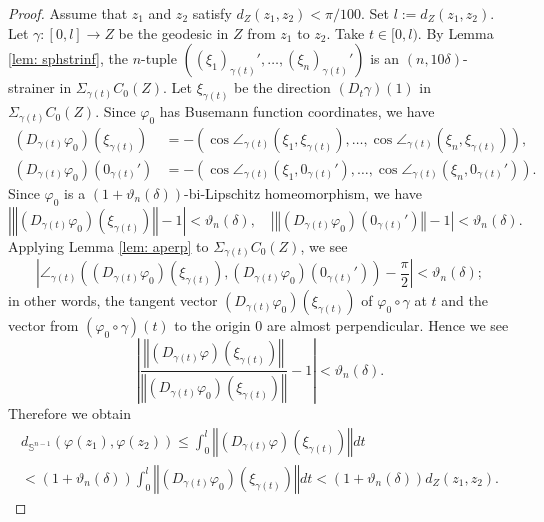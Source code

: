 \documentclass[a4paper,12pt]{amsart}
\newcommand{\Sph}{\operatorname{\mathbb{S}}}
\numberwithin{equation}{section}
\theoremstyle{plain}
\theoremstyle{definition}
\theoremstyle{remark}
\begin{document}
\begin{proof}
Assume that 
$z_1$ and $z_2$ satisfy $d_Z(z_1,z_2) < \pi/100$.
Set $l := d_Z(z_1,z_2)$.
Let $\gamma \colon [0,l] \to Z$ be the geodesic
in $Z$ from $z_1$ to $z_2$.
Take $t \in [0,l)$.
By Lemma \ref{lem: sphstrinf},
the $n$-tuple 
$\left( (\xi_1)_{\gamma(t)}', \dots, (\xi_n)_{\gamma(t)}' \right)$
is an $(n,10\delta)$-strainer in $\Sigma_{\gamma(t)}C_0(Z)$.
Let $\xi_{\gamma(t)}$ be the direction $\left (D_t\gamma \right)(1)$
in $\Sigma_{\gamma(t)}C_0(Z)$.
Since $\varphi_0$ has Busemann function coordinates,
we have
\begin{align*}
\left( D_{\gamma(t)} \varphi_0 \right) \left( \xi_{\gamma(t)} \right)
&= - \left( \cos \angle_{\gamma(t)}
\left( \xi_1, \xi_{\gamma(t)} \right), \dots,
\cos \angle_{\gamma(t)} \left( \xi_n, \xi_{\gamma(t)} \right) \right), \\
\left( D_{\gamma(t)} \varphi_0 \right) \left( 0_{\gamma(t)}' \right)
&= - \left( \cos \angle_{\gamma(t)} \left( \xi_1, 0_{\gamma(t)}' \right), 
\dots,
\cos \angle_{\gamma(t)} \left( \xi_n, 0_{\gamma(t)}' \right) \right).
\end{align*}
Since $\varphi_0$ is a 
$\left( 1+\vartheta_n(\delta) \right)$-bi-Lipschitz homeomorphism,
we have
\[
\left\vert 
\left\Vert
\left( D_{\gamma(t)} \varphi_0 \right) \left( \xi_{\gamma(t)} \right) 
\right\Vert - 1
\right\vert < \vartheta_n(\delta),
\quad
\left\vert 
\left\Vert
\left( D_{\gamma(t)} \varphi_0 \right) \left( 0_{\gamma(t)}' \right) 
\right\Vert - 1
\right\vert < \vartheta_n(\delta).
\]
Applying Lemma \ref{lem: aperp} to $\Sigma_{\gamma(t)}C_0(Z)$,
we see
\[
\left\vert 
\angle_{\gamma(t)} \left(
\left( D_{\gamma(t)} \varphi_0 \right) \left( \xi_{\gamma(t)} \right),
\left( D_{\gamma(t)} \varphi_0 \right) \left( 0_{\gamma(t)}' \right) \right)
- \frac{\pi}{2} 
\right\vert < \vartheta_n(\delta);
\]
in other words,
the tangent vector 
$\left( D_{\gamma(t)} \varphi_0 \right) \left( \xi_{\gamma(t)} \right)$
of $\varphi_0 \circ \gamma$ at $t$
and the vector from $(\varphi_0 \circ \gamma)(t)$ to the origin $0$ 
are almost perpendicular.
Hence we see
\[
\left\vert
\frac{
\left\Vert \left( D_{\gamma(t)} \varphi \right) 
\left( \xi_{\gamma(t)} \right) \right\Vert}
{\left\Vert \left( D_{\gamma(t)} \varphi_0 \right) 
\left( \xi_{\gamma(t)} \right) \right\Vert}
-1
\right\vert < \vartheta_n(\delta).
\]
Therefore we obtain
\begin{multline*}
d_{\Sph^{n-1}} \left( \varphi(z_1), \varphi(z_2) \right)
\le \int_0^l \left\Vert \left( D_{\gamma(t)} \varphi \right) 
\left( \xi_{\gamma(t)} \right) \right\Vert dt \\
< \left( 1+\vartheta_n(\delta) \right) 
\int_0^l \left\Vert \left( D_{\gamma(t)} \varphi_0 \right) 
\left( \xi_{\gamma(t)} \right) \right\Vert dt
< \left( 1+\vartheta_n(\delta) \right) d_Z(z_1,z_2).
\end{multline*}


\end{proof}
\end{document}
